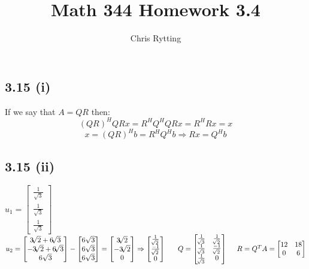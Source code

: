 \documentclass[letterpaper,12pt]{article}
\theoremstyle{definition}
\begin{document}
\title{Math 344 Homework 3.4}
\author{Chris Rytting}
\maketitle


\subsection*{3.15 (i)}
If we say that $A = QR$ then:
\[  (QR)^{H}QRx = R^HQ^HQRx = R^HRx = x  \]
\[  x = (QR)^Hb = R^HQ^Hb \Rightarrow Rx = Q^Hb  \]
\subsection*{3.15 (ii)}
$u_1 = \begin{bmatrix} \frac{1}{\sqrt{3}}\\ \frac{1}{\sqrt{3}}\\ \frac{1}{\sqrt{3}}
\end{bmatrix}$ ~~~~~
$u_2 = \begin{bmatrix} 
3\sqrt[]{2}+6\sqrt[]{3}\\
-3\sqrt[]{2}+6\sqrt[]{3}\\
6\sqrt{3}
\end{bmatrix} - \begin{bmatrix} 6\sqrt{3}\\ 6\sqrt{3}\\ 6\sqrt{3}
\end{bmatrix}
=\begin{bmatrix}
3\sqrt[]{2}\\-3\sqrt[]{2}\\ 0
\end{bmatrix}
\Rightarrow \begin{bmatrix}
\frac{1}{\sqrt[]{2}}\\
\frac{-1}{\sqrt[]{2}}\\ 0
\end{bmatrix}\\
~~~~~Q = \begin{bmatrix}
\frac{1}{\sqrt[]{3}} & \frac{1}{\sqrt[]{2}}\\
\frac{1}{\sqrt[]{3}} & \frac{-1}{\sqrt[]{2}}\\
\frac{1}{\sqrt[]{3}} & 0 
\end{bmatrix}~~~~
R = Q^TA = \begin{bmatrix}
12 & 18\\
0 & 6
\end{bmatrix}
$
\end{document}
